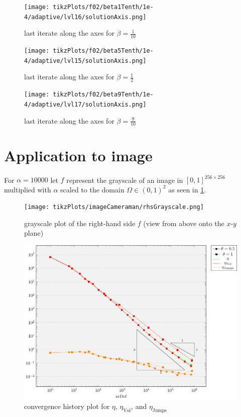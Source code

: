 \documentclass[draft=false,twoside,12pt]{scrreprt}
\begin{document}
\vspace{-\parskip}
\begin{minipage}[t]{0.3\textwidth}
  \begin{figure}[H]
	  \centering
		\texttt{[image: tikzPlots/f02/beta1Tenth/1e-4/adaptive/lvl16/solutionAxis.png]} 
      \caption{last iterate along the axes for $\beta=\frac{1}{10}$}
  \end{figure}
\end{minipage}
\hfill
\vline
\hfill
\begin{minipage}[t]{0.3\textwidth}
  \begin{figure}[H]
	  \centering
		\texttt{[image: tikzPlots/f02/beta5Tenth/1e-4/adaptive/lvl15/solutionAxis.png]} 
      \caption{last iterate along the axes for $\beta=\frac{1}{2}$}
  \end{figure}
\end{minipage}
\hfill
\vline
\hfill
\begin{minipage}[t]{0.3\textwidth}
  \begin{figure}[H]
	  \centering
		\texttt{[image: tikzPlots/f02/beta9Tenth/1e-4/adaptive/lvl17/solutionAxis.png]} 
      \caption{last iterate along the axes for $\beta=\frac{9}{10}$}
  \end{figure}
\end{minipage}

\section{Application to image}
For $\alpha = 10000$ let $f$ represent the grayscale of an image in
$[0,1]^{256\times 256}$ multiplied with $\alpha$ scaled to the domain
$\Omega\in(0,1)^2$ as seen in \cref{fig:rhsCameraman}.

\begin{figure}[H]
	\centering
	\texttt{[image: tikzPlots/imageCameraman/rhsGrayscale.png]}
  \caption{grayscale plot of the right-hand side $f$ (view from above onto the
  $x$-$y$ plane)}
  \label{fig:rhsCameraman}
\end{figure}

\begin{figure}[H]
	\centering
	\includegraphics[width=16cm]
  {tikzPlots/imageCameraman/convergence.pdf}
  \caption{convergence history plot for $\eta$,
  $\eta_\text{Vol}$, and $\eta_\text{Jumps}$}
\end{figure}
\end{document}
